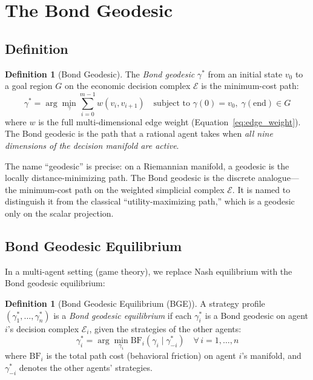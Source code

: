 \documentclass[12pt]{article}
\theoremstyle{definition}
\newtheorem{definition}[theorem]{Definition}
\theoremstyle{remark}
\newcommand{\E}{\mathcal{E}}               %
\newcommand{\BF}{\mathrm{BF}}              %
\begin{document}
\section{The Bond Geodesic}
\label{sec:geodesic}

\subsection{Definition}

\begin{definition}[Bond Geodesic]
\label{def:geodesic}
The \emph{Bond geodesic} $\gamma^*$ from an initial state $v_0$ to a goal region $G$ on the economic decision complex $\E$ is the minimum-cost path:
\begin{equation}
\gamma^* = \arg\min_\gamma \sum_{i=0}^{m-1} w(v_i, v_{i+1}) \quad \text{subject to } \gamma(0) = v_0,\; \gamma(\text{end}) \in G
\label{eq:geodesic}
\end{equation}
where $w$ is the full multi-dimensional edge weight (Equation~\ref{eq:edge_weight}).  The Bond geodesic is the path that a rational agent takes when \emph{all nine dimensions of the decision manifold are active}.
\end{definition}

The name ``geodesic'' is precise: on a Riemannian manifold, a geodesic is the locally distance-minimizing path.  The Bond geodesic is the discrete analogue---the minimum-cost path on the weighted simplicial complex $\E$.  It is named to distinguish it from the classical ``utility-maximizing path,'' which is a geodesic only on the scalar projection.

\subsection{Bond Geodesic Equilibrium}

In a multi-agent setting (game theory), we replace Nash equilibrium with the Bond geodesic equilibrium:

\begin{definition}[Bond Geodesic Equilibrium (BGE)]
\label{def:bge}
A strategy profile $(\gamma_1^*, \ldots, \gamma_n^*)$ is a \emph{Bond geodesic equilibrium} if each $\gamma_i^*$ is a Bond geodesic on agent $i$'s decision complex $\E_i$, given the strategies of the other agents:
\begin{equation}
\gamma_i^* = \arg\min_{\gamma_i} \BF_i(\gamma_i \mid \gamma_{-i}^*) \quad \forall\, i = 1, \ldots, n
\label{eq:bge}
\end{equation}
where $\BF_i$ is the total path cost (behavioral friction) on agent $i$'s manifold, and $\gamma_{-i}^*$ denotes the other agents' strategies.
\end{definition}
\end{document}
